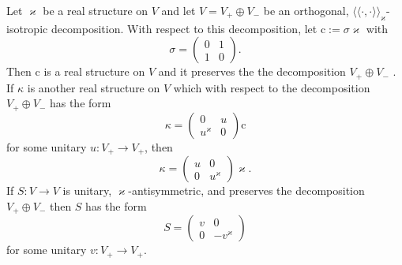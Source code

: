 \documentclass[11pt]{article}
\newcommand{\assign}{:=}
\newcommand{\cdummy}{\cdot}
\newcommand{\llangle}{{\langle\!\langle}}
\newcommand{\rrangle}{{\rangle\!\rangle}}
\begin{document}
\begin{remark}
  Let $\varkappa$ be a real structure on $V$ and let $V = V_+ \oplus V_-$ be
  an orthogonal, $\llangle \cdummy, \cdummy \rrangle_{\varkappa}$-isotropic
  decomposition. With respect to this decomposition, let $\mathrm{c} \assign
  \sigma \varkappa$ with
  \[ \sigma = \left( \begin{array}{ll}
       0 & 1\\
       1 & 0
     \end{array} \right) . \]
  Then $\mathrm{c}$ is a real structure on $V$ and it preserves the the
  decomposition $V_+ \oplus V_-$ . If $\kappa$ is another real structure on
  $V$ which with respect to the decomposition $V_+ \oplus V_-$ has the form
  \[ \kappa = \left(\begin{array}{cc}
       0 & u\\
       u^{\varkappa} & 0
     \end{array}\right) \mathrm{c} \]
  for some unitary $u : V_+ \rightarrow V_+$, then
  \[ \kappa = \left(\begin{array}{cc}
       u & 0\\
       0 & u^{\varkappa}
     \end{array}\right) \varkappa . \]
  If $S : V \rightarrow V$ is unitary, $\varkappa$-antisymmetric, and
  preserves the decomposition $V_+ \oplus V_-$ then $S$ has the form
  \[ S = \left(\begin{array}{cc}
       v & 0\\
       0 & - v^{\varkappa}
     \end{array}\right) \]
  for some unitary $v : V_+ \rightarrow V_+$.
\end{remark}
\end{document}
